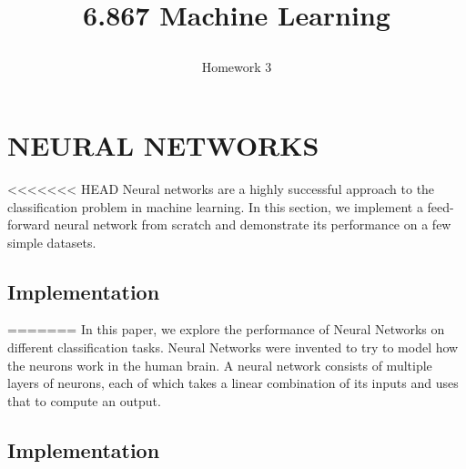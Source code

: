 \documentclass[10pt,twoside]{article}
\begin{document}
\title{6.867 Machine Learning  \subtitle{Homework 3} }

\maketitle


\section{\uppercase{Neural Networks}}

<<<<<<< HEAD
\noindent Neural networks are a highly successful approach to the classification problem in machine learning. In this section, we implement a feed-forward neural network from scratch and demonstrate its performance on a few simple datasets.

\subsection{Implementation}

\noindent 
=======
\noindent In this paper, we explore the performance of Neural Networks on different classification tasks. Neural Networks were invented to try to model how the neurons work in the human brain. A neural network consists of multiple layers of neurons, each of which takes a linear combination of its inputs and uses that to compute an output. 


\subsection{Implementation}
\end{document}
